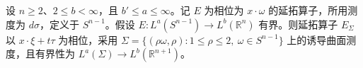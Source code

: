 设 \(n\ge2\)、\(2\le b<\infty\)，且 \(b'\le a\le\infty\)。记 \(E\) 为相位为 \(x\cdot\omega\) 的延拓算子，所用测度为 \(d\sigma\)，定义于 \(S^{n-1}\)。假设 \(E:L^a(S^{n-1})\to L^b(\mathbb R^n)\) 有界。则延拓算子 \(E_\Sigma\) 以 \(x\cdot\xi+t\tau\) 为相位，采用 \(\Sigma=\{(\rho\omega,\rho):1\le\rho\le2,\ \omega\in S^{n-1}\}\) 上的诱导曲面测度，且有界性为 \(L^a(\Sigma)\to L^b(\mathbb R^{n+1})\)。
